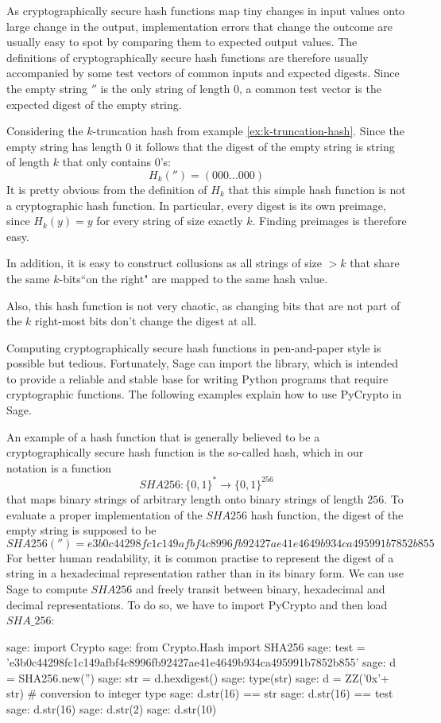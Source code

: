 As cryptographically secure hash functions map tiny changes in input values onto large change in the output, implementation errors that change the outcome are usually easy to spot by comparing them to expected output values. The definitions of cryptographically secure hash functions are therefore usually accompanied by some test vectors of common inputs and expected digests. Since the empty string $''$ is the only string of length $0$, a common test vector is the expected digest of the empty string.
\begin{example} Considering the $k$-truncation hash from example \ref{ex:k-truncation-hash}. Since the empty string has length $0$ it follows that the digest of the empty string is string of length $k$ that only contains $0$'s: 
$$
H_k('')= (000\ldots 000)
$$
It is pretty obvious from the definition of $H_k$ that this simple hash function is not a cryptographic hash function. In particular, every digest is its own preimage, since $H_k(y)=y$ for every string of size exactly $k$. Finding preimages is therefore easy. 

In addition, it is easy to construct collusions as all strings of size $>k$ that share the same $k$-bits``on the right" are mapped to the same hash value.

Also, this hash function is not very chaotic, as changing bits that are not part of the $k$ right-most bits don't change the digest at all.  
\end{example}
Computing cryptographically secure hash functions in pen-and-paper style is possible but tedious. Fortunately, Sage can import the  library, which is intended to provide a reliable and stable base for writing Python programs that require cryptographic functions. The following examples explain how to use PyCrypto in Sage.
\begin{example}\label{ex:SHA256}An example of a hash function that is generally believed to be a cryptographically secure hash function is the so-called  hash, which in our notation is a function
$$
SHA256: \{0,1\}^* \to \{0,1\}^{256}
$$
that maps binary strings of arbitrary length onto binary strings of length $256$. To evaluate a proper implementation of the $SHA256$ hash function, the digest of the empty string is supposed to be
$$
SHA256('')= e3b0c44298fc1c149afbf4c8996fb92427ae41e4649b934ca495991b7852b855
$$
For better human readability, it is common practise to represent the digest of a string in a hexadecimal representation rather than in its binary form. We can use Sage to compute $SHA256$ and freely transit between binary, hexadecimal and decimal representations. To do so, we have to import PyCrypto and then load $SHA\_256$:
\begin{sagecommandline}
sage: import Crypto
sage: from Crypto.Hash import SHA256
sage: test = 'e3b0c44298fc1c149afbf4c8996fb92427ae41e4649b934ca495991b7852b855'
sage: d = SHA256.new('')
sage: str = d.hexdigest()
sage: type(str)
sage: d = ZZ('0x'+ str) # conversion to integer type
sage: d.str(16) == str
sage: d.str(16) == test
sage: d.str(16)
sage: d.str(2)
sage: d.str(10)
\end{sagecommandline}
\end{example}

